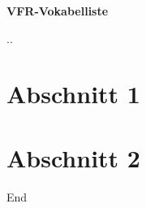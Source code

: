 \documentclass[10pt,a4paper]{article}
\begin{document}
\setlength{\parindent}{0pt}

\begin{center}
\huge
\vspace{1cm}

\textbf{VFR-Vokabelliste}
\normalsize

\vspace{.5cm}
\the\day.\the\month.\the\year
\end{center}



%


\tableofcontents

\newpage %


\section{Abschnitt 1}

\newpage
\section{Abschnitt 2}





\newpage 		%
\hspace{0pt}	%
\vfill			%
\centering		%
End				%
\vfill			%
\hspace{0pt}	%
\end{document}
